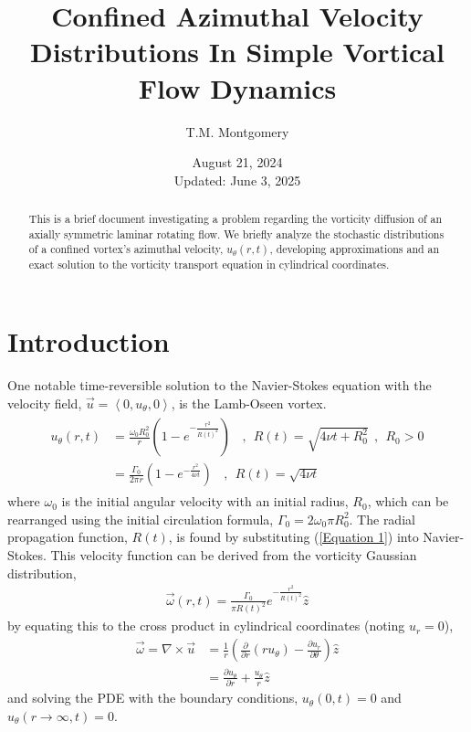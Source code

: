 \documentclass{article}
\title{Confined Azimuthal Velocity Distributions In Simple Vortical Flow Dynamics}
\author{T.M. Montgomery}
\date{August 21, 2024 \\ Updated: June 3, 2025}
\begin{document}
\maketitle

\begin{abstract}
    This is a brief document investigating a problem regarding the vorticity diffusion of an axially symmetric laminar rotating flow. We briefly analyze the stochastic distributions of a confined vortex's azimuthal velocity, $u_\theta (r,t)$, developing approximations and an exact solution to the vorticity transport equation in cylindrical coordinates.
\end{abstract}

\tableofcontents

\section{Introduction}
One notable time-reversible solution to the Navier-Stokes equation with the velocity field, $\vec{u}=\left< 0,u_\theta ,0\right>$, is the Lamb-Oseen vortex.
\begin{align}\label{Equation 1} 
\begin{split}
u_{\theta} (r,t)
&= \frac{\omega_0 R_0^2}{r}\left(1-e^{-\frac{r^2}{R(t)^2}}\right) \:\:\:\:,\:\: R(t)=\sqrt{4\nu t+R_0^2}\:\:,\:\: R_0>0 \\
&= \frac{\Gamma_0}{2\pi r}\left(1-e^{-\frac{r^2}{4\nu t}}\right) \:\:\:\:,\:\: R(t)=\sqrt{4\nu t}
\end{split}
\end{align}
where $\omega_0$ is the initial angular velocity with an initial radius, $R_0$, which can be rearranged using the initial circulation formula, $\Gamma_0 = 2\omega_0 \pi R_0^2$. The radial propagation function, $R(t)$, is found by substituting (\ref{Equation 1}) into Navier-Stokes. This velocity function can be derived from the vorticity Gaussian distribution,
\begin{align*}
    \vec{\omega}(r,t)= \frac{\Gamma_0}{\pi R(t)^2}e^{-\frac{r^2}{R(t)^2}}\hat{z}
\end{align*}
by equating this to the cross product in cylindrical coordinates (noting $u_r =0$),
\begin{align*} 
\Vec{\omega}=\nabla \times \Vec{u}
&= \frac{1}{r}\left(\frac{\partial }{\partial r}\left( r u_\theta\right)- \frac{\partial u_r}{\partial \theta}\right)\hat{z} \\
&=  \frac{\partial u_\theta}{\partial r}+\frac{u_\theta}{r}\hat{z}
\end{align*}
and solving the PDE with the boundary conditions, $u_\theta (0,t)=0$ and $u_\theta (r\to \infty,t)=0$.
\end{document}
